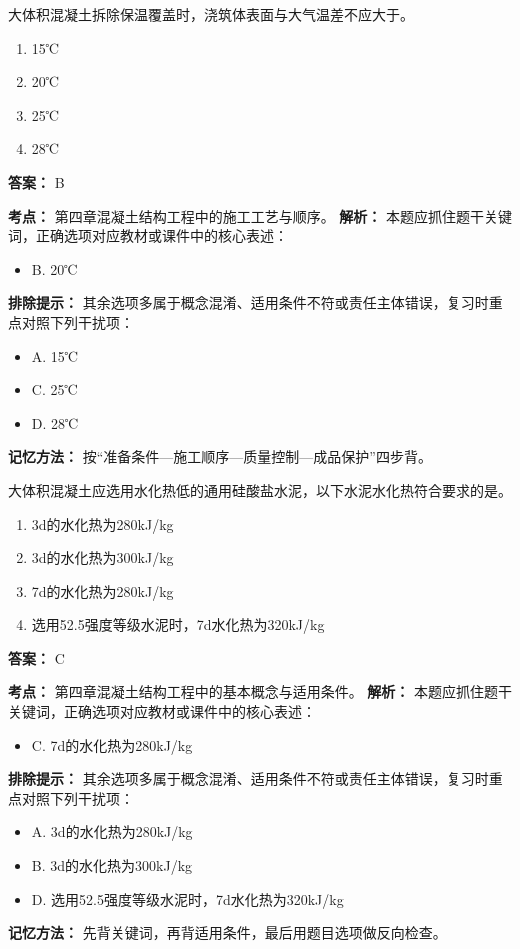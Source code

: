 \documentclass[UTF8,fontset=fandol,11pt]{ctexart}
\begin{document}
\begin{quizbox}[title={第 84 题}]
大体积混凝土拆除保温覆盖时，浇筑体表面与大气温差不应大于。\\
\begin{enumerate}[label=\Alph*.]
\item 15℃
\item 20℃
\item 25℃
\item 28℃
\end{enumerate}
\textbf{答案：} B
\vspace{0.25em}
\begin{answerbox}[title={考点解析}]
\textbf{考点：} 第四章混凝土结构工程中的施工工艺与顺序。
\textbf{解析：} 本题应抓住题干关键词，正确选项对应教材或课件中的核心表述：
\begin{itemize}
\item B. 20℃
\end{itemize}
\textbf{排除提示：} 其余选项多属于概念混淆、适用条件不符或责任主体错误，复习时重点对照下列干扰项：
\begin{itemize}
\item A. 15℃
\item C. 25℃
\item D. 28℃
\end{itemize}
\textbf{记忆方法：} 按“准备条件—施工顺序—质量控制—成品保护”四步背。
\end{answerbox}
\end{quizbox}

\begin{quizbox}[title={第 85 题}]
大体积混凝土应选用水化热低的通用硅酸盐水泥，以下水泥水化热符合要求的是。\\
\begin{enumerate}[label=\Alph*.]
\item 3d的水化热为280kJ/kg
\item 3d的水化热为300kJ/kg
\item 7d的水化热为280kJ/kg
\item 选用52.5强度等级水泥时，7d水化热为320kJ/kg
\end{enumerate}
\textbf{答案：} C
\vspace{0.25em}
\begin{answerbox}[title={考点解析}]
\textbf{考点：} 第四章混凝土结构工程中的基本概念与适用条件。
\textbf{解析：} 本题应抓住题干关键词，正确选项对应教材或课件中的核心表述：
\begin{itemize}
\item C. 7d的水化热为280kJ/kg
\end{itemize}
\textbf{排除提示：} 其余选项多属于概念混淆、适用条件不符或责任主体错误，复习时重点对照下列干扰项：
\begin{itemize}
\item A. 3d的水化热为280kJ/kg
\item B. 3d的水化热为300kJ/kg
\item D. 选用52.5强度等级水泥时，7d水化热为320kJ/kg
\end{itemize}
\textbf{记忆方法：} 先背关键词，再背适用条件，最后用题目选项做反向检查。
\end{answerbox}
\end{quizbox}
\end{document}
